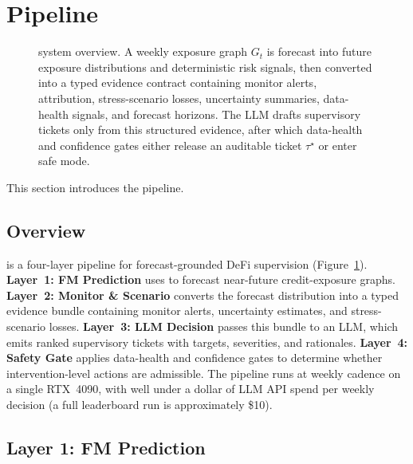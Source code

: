 \section{\sysname{} Pipeline}
\label{sec:pipeline}

\begin{figure}[t]
\centering
\resizebox{0.95\textwidth}{!}{}
\caption{\sysname{} system overview. A weekly exposure graph $G_t$ is
forecast into future exposure distributions and deterministic risk signals,
then converted into a typed evidence contract containing monitor alerts,
attribution, stress-scenario losses, uncertainty summaries, data-health
signals, and forecast horizons. The LLM drafts supervisory tickets only from
this structured evidence, after which data-health and confidence gates either
release an auditable ticket $\tau^{\star}$ or enter safe mode.}
\label{fig:system}
\end{figure}

This section introduces the \sysname{} pipeline.

\subsection{Overview}

\sysname{} is a four-layer pipeline for forecast-grounded DeFi supervision
(Figure~\ref{fig:system}). \textbf{Layer~1: FM Prediction} uses \fmname{} to
forecast near-future credit-exposure graphs. \textbf{Layer~2: Monitor \&
Scenario} converts the forecast distribution into a typed evidence bundle
containing monitor alerts, uncertainty estimates, and stress-scenario losses.
\textbf{Layer~3: LLM Decision} passes this bundle to an LLM, which emits
ranked supervisory tickets with targets, severities, and rationales.
\textbf{Layer~4: Safety Gate} applies data-health and confidence gates to
determine whether intervention-level actions are admissible. The pipeline runs at weekly
cadence on a single RTX~4090, with well under a dollar of LLM API spend
per weekly decision (a full \benchname{} leaderboard run is
approximately \$10).

\subsection{Layer 1: FM Prediction}
\label{ssec:forecaster}

